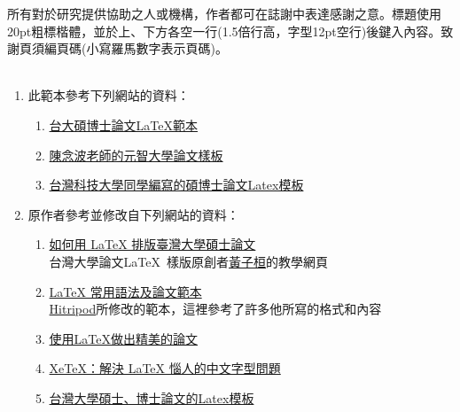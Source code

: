 \begin{acknowledgementsCH}

所有對於研究提供協助之人或機構，作者都可在誌謝中表達感謝之意。標題使用20pt粗標楷體，並於上、下方各空一行(1.5倍行高，字型12pt空行)後鍵入內容。致謝頁須編頁碼(小寫羅馬數字表示頁碼)。\\\\



\begin{enumerate}[leftmargin=0pt, topsep=0pt, itemsep=0pt, label=\Roman{*}.]

\item 此範本參考下列網站的資料：
\begin{enumerate}[topsep=0pt, itemsep=0pt, label=$\bullet$]
    \item \href{https://code.google.com/p/ntu-thesis-latex-template/}{台大碩博士論文LaTeX範本}
    \item \href{http://exciton.eo.yzu.edu.tw/~lab/latex/latex_note.html}{陳念波老師的元智大學論文樣板}
    \item \href{https://code.google.com/p/ntust-thesis/}{台灣科技大學同學編寫的碩博士論文Latex模板}
\end{enumerate}

\item 原作者參考並修改自下列網站的資料：
\begin{enumerate}[topsep=0pt, itemsep=0pt, label=$\bullet$]
    \item \href{http://www.csie.ntu.edu.tw/~tzhuan/www/resources/ntu/}{如何用 LaTeX 排版臺灣大學碩士論文}\\
    \textemdash 台灣大學論文\LaTeX\ 樣版原創者\href{http://www.csie.ntu.edu.tw/~tzhuan/www/}{黃子桓}的教學網頁
    \item \href{http://www.hitripod.com/blog/2012/05/latex-thesis-template-quick-reference/}{LaTeX 常用語法及論文範本}\\
    \textemdash \href{http://www.hitripod.com/blog/}{Hitripod}所修改的範本，這裡參考了許多他所寫的格式和內容
    \item \href{http://www.cc.ntu.edu.tw/chinese/epaper/0014/20100920_1404.htm}{使用LaTeX做出精美的論文}
    \item \href{http://www.hitripod.com/blog/2011/04/xetex-chinese-font-cjk-latex/}{XeTeX：解決 LaTeX 惱人的中文字型問題}
    \item \href{http://code.google.com/p/ntuthesis/}{台灣大學碩士、博士論文的Latex模板}\\   
\end{enumerate}

\end{enumerate}



\end{acknowledgementsCH} 